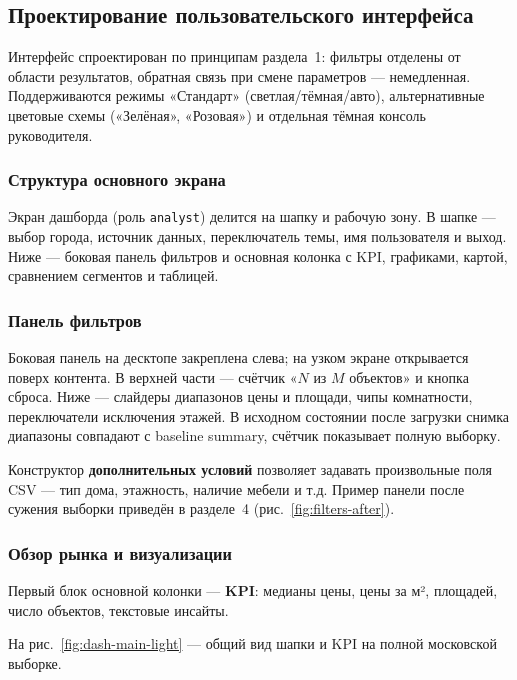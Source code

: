 \subsection{Проектирование пользовательского интерфейса}

Интерфейс спроектирован по принципам раздела~1: фильтры отделены от области результатов, обратная связь при смене параметров --- немедленная. Поддерживаются режимы «Стандарт» (светлая/тёмная/авто), альтернативные цветовые схемы («Зелёная», «Розовая») и отдельная тёмная консоль руководителя.

\subsubsection{Структура основного экрана}

Экран дашборда (роль \texttt{analyst}) делится на шапку и рабочую зону. В шапке --- выбор города, источник данных, переключатель темы, имя пользователя и выход. Ниже --- боковая панель фильтров и основная колонка с KPI, графиками, картой, сравнением сегментов и таблицей.

\subsubsection{Панель фильтров}

Боковая панель на десктопе закреплена слева; на узком экране открывается поверх контента. В верхней части --- счётчик «$N$ из $M$ объектов» и кнопка сброса. Ниже --- слайдеры диапазонов цены и площади, чипы комнатности, переключатели исключения этажей. В исходном состоянии после загрузки снимка диапазоны совпадают с baseline summary, счётчик показывает полную выборку.

Конструктор \textbf{дополнительных условий} позволяет задавать произвольные поля CSV --- тип дома, этажность, наличие мебели и т.д. Пример панели после сужения выборки приведён в разделе~4 (рис.~\ref{fig:filters-after}).

\subsubsection{Обзор рынка и визуализации}

Первый блок основной колонки --- \textbf{KPI}: медианы цены, цены за м², площадей, число объектов, текстовые инсайты.

На рис.~\ref{fig:dash-main-light} --- общий вид шапки и KPI на полной московской выборке.


